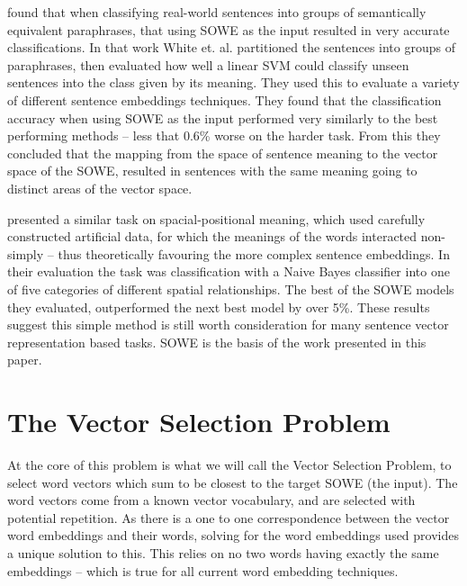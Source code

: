 \documentclass{llncs}
\begin{document}
\textcite{White2015SentVecMeaning} found that when classifying real-world sentences into groups of semantically equivalent paraphrases, that using SOWE as the input resulted in very accurate classifications. In that work White et. al. partitioned the sentences into groups of paraphrases, then evaluated how well a linear SVM could classify unseen sentences into the class given by its meaning. They used this to evaluate a  variety of different sentence embeddings techniques. They found that the classification accuracy when using SOWE as the input performed very similarly to the best performing methods -- less that 0.6\% worse on the harder task. From this they concluded that the mapping from the space of sentence meaning to the vector space of the SOWE, resulted in sentences with the same meaning going to distinct areas of the vector space.

\textcite{RitterPosition} presented a similar task on spacial-positional meaning, which used carefully constructed artificial data, for which the meanings of the words interacted non-simply -- thus theoretically favouring the more complex sentence embeddings. In their evaluation the task was classification with a Naive Bayes classifier into one of five categories of different spatial relationships. The best of the SOWE models they evaluated, outperformed the next best model by over 5\%. These results suggest this simple method is still worth consideration for many sentence vector representation based tasks. SOWE is the basis of the work presented in this paper.

\section{The Vector Selection Problem}\label{framework}

At the core of this problem is what we will call the Vector Selection Problem, to select word vectors which sum to be closest to the target SOWE (the input). The word vectors come from a known vector vocabulary, and are selected with potential repetition.
As there is a one to one correspondence between the vector word embeddings and their words, solving for the word embeddings used provides a unique solution to this. This relies on no two words having exactly the same embeddings -- which is true for all current word embedding techniques.

\renewcommand{\c}{\tilde{c}}
\newcommand{\s}{\tilde{s}}
\newcommand{\x}{\tilde{x}}
\renewcommand{\t}{\tilde{t}}
\newcommand{\N}{\mathbb{N}}
\newcommand{\R}{\mathbb{R}}
\newcommand{\V}{\mathcal{V}}
\end{document}
